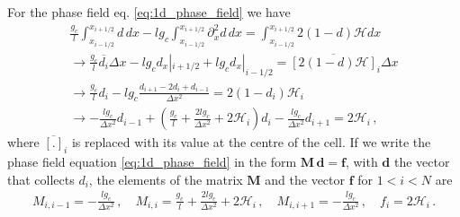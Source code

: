 \documentclass[11pt,a4paper]{article}
\newcommand{\p}{\partial}
\begin{document}
For the phase field eq. \eqref{eq:1d_phase_field} we have
\begin{align}
    \frac{g_c}{l} \int_{x_{i-1/2}}^{x_{i+1/2}} d \, dx
    - l g_c \int_{x_{i-1/2}}^{x_{i+1/2}} \p_x^2 d \, dx
    = \int_{x_{i-1/2}}^{x_{i+1/2}} 2(1-d) \mathcal{H} dx
    \nonumber \\
    \rightarrow
    \frac{g_c}{l} \overline{d_i} \Delta x
    - l g_c d_x|_{i+1/2} + l g_c d_x|_{i-1/2}
    = \overline{[2(1-d)\mathcal{H}]}_i \Delta x
    \nonumber \\
    \rightarrow
    \frac{g_c}{l} d_i - l g_c \frac{d_{i+1} - 2d_i + d_{i-1}}{\Delta x^2} = 2 (1-d_i) \mathcal{H}_i
    \nonumber \\
    \rightarrow
    - \frac{l g_c}{\Delta x^2} d_{i-1}
    + \left( \frac{g_c}{l} + \frac{2 l g_c}{\Delta x^2} + 2 \mathcal{H}_i\right) d_i
    - \frac{l g_c}{\Delta x^2} d_{i+1}
    = 2 \mathcal{H}_i
    \,,
    \label{eq:discrete_1d_phase_field}
\end{align}
where $\overline{[.]}_i$ is replaced with its value at the centre of the cell. If we write the phase field equation \eqref{eq:1d_phase_field} in the form $\mathbf{M} \, \mathbf{d} = \mathbf{f}$, with $\mathbf{d}$ the vector that collects $d_i$, the elements of the matrix $\mathbf{M}$ and the vector $\mathbf{f}$ for $1<i<N$ are
\begin{align*}
    M_{i,i-1} = - \frac{l g_c}{\Delta x^2}
    \,, \quad
    M_{i,i} = \frac{g_c}{l} + \frac{2 l g_c}{\Delta x^2} + 2 \mathcal{H}_i
    \,, \quad
    M_{i,i+1} = - \frac{l g_c}{\Delta x^2}
    \,, \quad
    f_i = 2 \mathcal{H}_i
    \,.
\end{align*}
\end{document}
